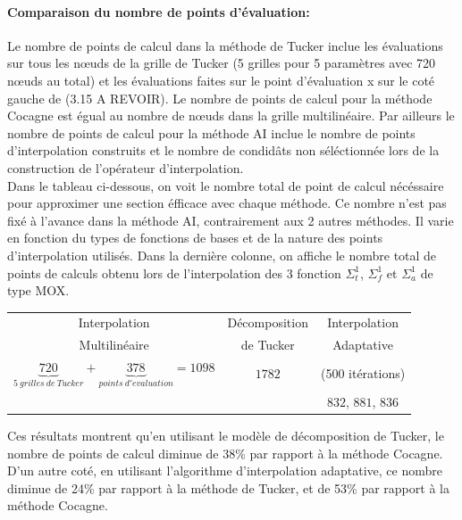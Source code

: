 \paragraph{Comparaison du nombre de points d'évaluation:\\}
\hspace{0.5cm} Le nombre de points de calcul dans la méthode de Tucker inclue les évaluations sur tous les nœuds de la grille de Tucker (5 grilles pour 5 paramètres avec 720 nœuds au total) et les évaluations
faites sur le point d'évaluation x sur le coté gauche de (3.15 A REVOIR). Le nombre de points de calcul pour la méthode Cocagne est égual au nombre de nœuds dans la grille multilinéaire. Par ailleurs le nombre de points
de calcul pour la méthode AI inclue le nombre de points d'interpolation construits et le nombre de condidâts non séléctionnée lors de la construction de l'opérateur d'interpolation.\\
\hspace{0.5cm} Dans le tableau ci-dessous, on voit le nombre total de point de calcul nécéssaire pour approximer une section éfficace avec chaque méthode.
Ce nombre n'est pas fixé à l'avance dans la méthode AI, contrairement aux 2 autres méthodes. Il varie en fonction du types de fonctions de bases et de la nature des
points d'interpolation utilisés. Dans la dernière colonne, on affiche le nombre total de points de calculs obtenu lors de l'interpolation des 3 fonction $\Sigma_t^1$, $\Sigma_f^1$  et $\Sigma_a^1$ de type MOX.
\begin{center}
\begin{table}
\begin{tabular}{|*{3}{c|}}
	\hline
	Interpolation     																																						& Décomposition  	& Interpolation  			\\
	Multilinéaire																																									& de Tucker				& Adaptative					\\
	\hline
	$\underbrace{720}_{5\ grilles\ de\ Tucker} + \underbrace{378}_{points\ d'evaluation} = 1098$	& $1782$					& 	(500 itérations)  \\
																																																&									&	$832$, $881$, $836$	\\
	\hline
\end{tabular}
\label{table:nbpointscalcul}
\end{table}
\end{center}
\hspace{0.5cm} Ces résultats montrent qu'en utilisant le modèle de décomposition de Tucker, le nombre de points de calcul diminue de 38\% par rapport à la méthode Cocagne.
D'un autre coté, en utilisant l'algorithme d'interpolation adaptative, ce nombre diminue de 24\% par rapport à la méthode de Tucker, et de 53\% par rapport à la méthode Cocagne.

